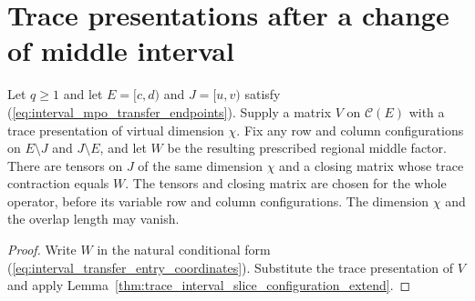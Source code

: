\section{Trace presentations after a change of middle interval}

\begin{lemma}
    \label{thm:interval_trace_factor_transfer}
    \leanok
    Let $q\ge1$ and let $E=\lbrack c,d)$ and $J=\lbrack u,v)$ satisfy
    (\ref{eq:interval_mpo_transfer_endpoints}). Supply a matrix $V$ on
    $\mathcal C(E)$ with a trace presentation of virtual dimension $\chi$.
    Fix any row and column configurations on $E\setminus J$ and
    $J\setminus E$, and let $W$ be the resulting prescribed regional
    middle factor. There are tensors on $J$ of the same dimension $\chi$
    and a closing matrix whose trace contraction equals $W$.
    The tensors and closing matrix are chosen for the whole operator,
    before its variable row and column configurations. The dimension
    $\chi$ and the overlap length may vanish.
\end{lemma}
\begin{proof}\leanok
    Write $W$ in the natural conditional form
    (\ref{eq:interval_transfer_entry_coordinates}). Substitute the trace
    presentation of $V$ and apply
    Lemma~\ref{thm:trace_interval_slice_configuration_extend}.
\end{proof}

